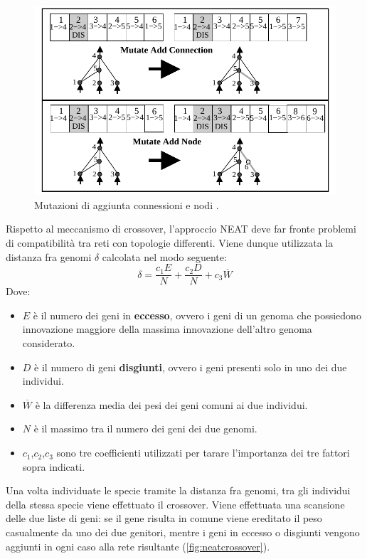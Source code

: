 \begin{figure}[H]
	\includegraphics[width=\textwidth]{img/neat-mutation.png}
	\caption{Mutazioni di aggiunta connessioni e nodi
	\cite{stanley2002evolving}.}
	\label{fig:nodemutate}
\end{figure}

Rispetto al meccanismo di crossover, l'approccio NEAT deve far fronte problemi
di compatibilità tra reti con topologie differenti. Viene dunque utilizzata la
distanza fra genomi $\delta$ calcolata nel modo seguente:
\[\delta = \frac{c_1 E}{N} + \frac{c_2 D}{N} + c_3 \overline{W}\]
Dove:
\begin{itemize}
	\item $E$ è il numero dei geni in \textbf{eccesso}, ovvero i geni
	di un genoma che possiedono innovazione maggiore della massima
	innovazione dell'altro genoma considerato.
	\item $D$ è il numero di geni \textbf{disgiunti}, ovvero i geni presenti
	solo in uno dei due individui.
	\item $\overline{W}$ è la differenza media dei pesi dei geni comuni ai
	due individui.
	\item $N$ è il massimo tra il numero dei geni dei due genomi.

	\item $c_1$,$c_2$,$c_3$ sono tre coefficienti utilizzati per tarare
	l'importanza dei tre fattori sopra indicati.
\end{itemize}

Una volta individuate le specie tramite la distanza fra genomi, tra gli
individui della stessa specie viene effettuato il crossover. Viene effettuata
una scansione delle due liste di geni: se il gene risulta in comune viene
ereditato il peso casualmente da uno dei due genitori, mentre i geni in eccesso
o disgiunti vengono aggiunti in ogni caso alla rete risultante 
(\cref{fig:neatcrossover}).


